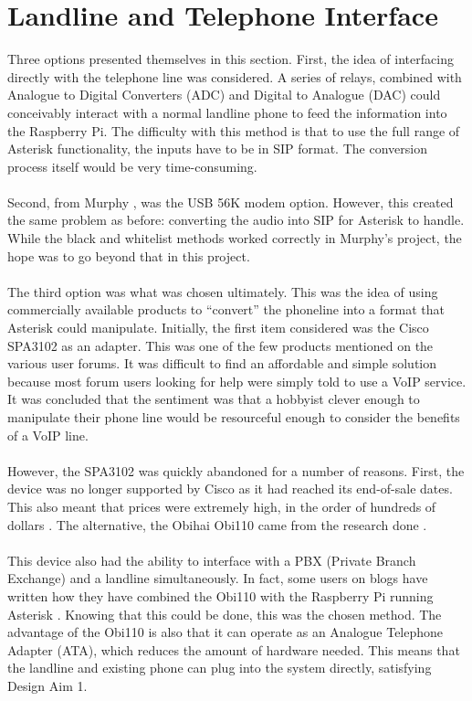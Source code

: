 \documentclass[main.tex]{subfiles}
\begin{document}
\section{Landline and Telephone Interface}
Three options presented themselves in this section. First, the idea of interfacing directly with the telephone line was considered. A series of relays, combined with Analogue to Digital Converters (ADC) and Digital to Analogue (DAC) could conceivably interact with a normal landline phone to feed the information into the Raspberry Pi. The difficulty with this method is that to use the full range of Asterisk functionality, the inputs have to be in SIP format. The conversion process itself would be very time-consuming.
\\\\
Second, from Murphy \cite{murphy}, was the USB 56K modem option. However, this created the same problem as before: converting the audio into SIP for Asterisk to handle. While the black and whitelist methods worked correctly in Murphy's project, the hope was to go beyond that in this project.
\\\\
The third option was what was chosen ultimately. This was the idea of using commercially available products to ``convert'' the phoneline into a format that Asterisk could manipulate. Initially, the first item considered was the Cisco SPA3102 \cite{spa3102-specs} as an adapter. This was one of the few products mentioned on the various user forums. It was difficult to find an affordable and simple solution because most forum users looking for help were simply told to use a VoIP service. It was concluded that the sentiment was that a hobbyist clever enough to manipulate their phone line would be resourceful enough to consider the benefits of a VoIP line.
\\\\
However, the SPA3102 was quickly abandoned for a number of reasons. First, the device was no longer supported by Cisco as it had reached its end-of-sale dates. This also meant that prices were extremely high, in the order of hundreds of dollars \cite{spa3102-amazon}. The alternative, the Obihai Obi110 \cite{obi110-specs} came from the research done \cite{bryanross}.
\\\\
This device also had the ability to interface with a PBX (Private Branch Exchange) and a landline simultaneously. In fact, some users on blogs have written how they have combined the Obi110 with the Raspberry Pi running Asterisk \cite{bryanross}. Knowing that this could be done, this was the chosen method. The advantage of the Obi110 is also that it can operate as an Analogue Telephone Adapter (ATA), which reduces the amount of hardware needed. This means that the landline and existing phone can plug into the system directly, satisfying Design Aim 1.
\end{document}
